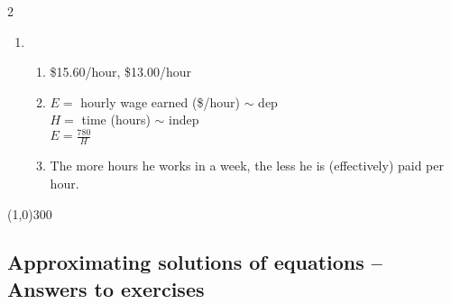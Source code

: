 \begin{multicols} {2}
\begin{enumerate}
\item %
\begin{enumerate}
\item \$15.60/hour, \$13.00/hour
\item $E=$ hourly wage earned (\$/hour) $\sim$ dep \\ $H=$ time (hours) $\sim$ indep \\$\displaystyle E = \frac{780}{H}$
\item The more hours he works in a week, the less he is (effectively) paid per hour.
\end{enumerate} 

\end{enumerate}
\end{multicols}

\begin{center}
\line(1,0){300} %
\end{center}

\subsection {Approximating solutions of equations -- Answers to exercises} %

